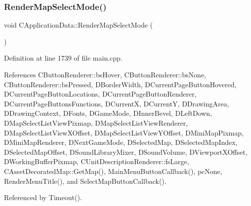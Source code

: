 \subsubsection{\texorpdfstring{Render\+Map\+Select\+Mode()}{RenderMapSelectMode()}}
{\footnotesize\ttfamily void C\+Application\+Data\+::\+Render\+Map\+Select\+Mode (\begin{DoxyParamCaption}{ }\end{DoxyParamCaption})\hspace{0.3cm}{\ttfamily [protected]}}



Definition at line 1739 of file main.\+cpp.



References C\+Button\+Renderer\+::bs\+Hover, C\+Button\+Renderer\+::bs\+None, C\+Button\+Renderer\+::bs\+Pressed, D\+Border\+Width, D\+Current\+Page\+Button\+Hovered, D\+Current\+Page\+Button\+Locations, D\+Current\+Page\+Button\+Renderer, D\+Current\+Page\+Buttons\+Functions, D\+CurrentX, D\+CurrentY, D\+Drawing\+Area, D\+Drawing\+Context, D\+Fonts, D\+Game\+Mode, D\+Inner\+Bevel, D\+Left\+Down, D\+Map\+Select\+List\+View\+Pixmap, D\+Map\+Select\+List\+View\+Renderer, D\+Map\+Select\+List\+View\+X\+Offset, D\+Map\+Select\+List\+View\+Y\+Offset, D\+Mini\+Map\+Pixmap, D\+Mini\+Map\+Renderer, D\+Next\+Game\+Mode, D\+Selected\+Map, D\+Selected\+Map\+Index, D\+Selected\+Map\+Offset, D\+Sound\+Library\+Mixer, D\+Sound\+Volume, D\+Viewport\+X\+Offset, D\+Working\+Buffer\+Pixmap, C\+Unit\+Description\+Renderer\+::fs\+Large, C\+Asset\+Decorated\+Map\+::\+Get\+Map(), Main\+Menu\+Button\+Callback(), pc\+None, Render\+Menu\+Title(), and Select\+Map\+Button\+Callback().



Referenced by Timeout().



